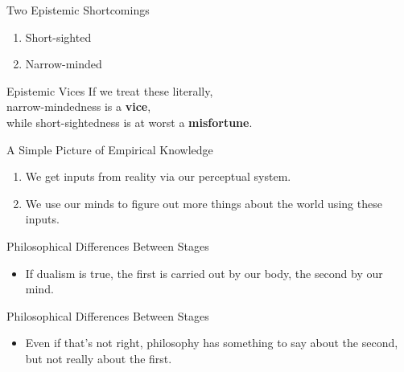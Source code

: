 \documentclass[
  17pt,
  letterpaper,
  ignorenonframetext,
  aspectratio=169,
  handout]{beamer}
\providecommand{\tightlist}{%
  \setlength{\itemsep}{0pt}\setlength{\parskip}{0pt}}\usepackage{longtable,booktabs,array}
\begin{document}
\begin{frame}{Two Epistemic Shortcomings}
\protect\hypertarget{two-epistemic-shortcomings}{}
\begin{enumerate}[<+->]
\item
  Short-sighted
\item
  Narrow-minded
\end{enumerate}
\end{frame}

\begin{frame}{Epistemic Vices}
\protect\hypertarget{epistemic-vices}{}
If we treat these literally,\\
\hspace*{0.333em}\hspace*{0.333em}\hspace*{0.333em}\hspace*{0.333em}narrow-mindedness
is a \textbf{vice},\\
\hspace*{0.333em}\hspace*{0.333em}\hspace*{0.333em}\hspace*{0.333em}while
short-sightedness is at worst a \textbf{misfortune}.
\end{frame}

\begin{frame}{A Simple Picture of Empirical Knowledge}
\protect\hypertarget{a-simple-picture-of-empirical-knowledge}{}
\begin{enumerate}[<+->]
\tightlist
\item
  We get inputs from reality via our perceptual system.
\item
  We use our minds to figure out more things about the world using these
  inputs.
\end{enumerate}
\end{frame}

\begin{frame}{Philosophical Differences Between Stages}
\protect\hypertarget{philosophical-differences-between-stages}{}
\begin{itemize}[<+->]
\tightlist
\item
  If dualism is true, the first is carried out by our body, the second
  by our mind.
\end{itemize}
\end{frame}

\begin{frame}{Philosophical Differences Between Stages}
\protect\hypertarget{philosophical-differences-between-stages-1}{}
\begin{itemize}[<+->]
\tightlist
\item
  Even if that's not right, philosophy has something to say about the
  second, but not really about the first.
\end{itemize}
\end{frame}
\end{document}
